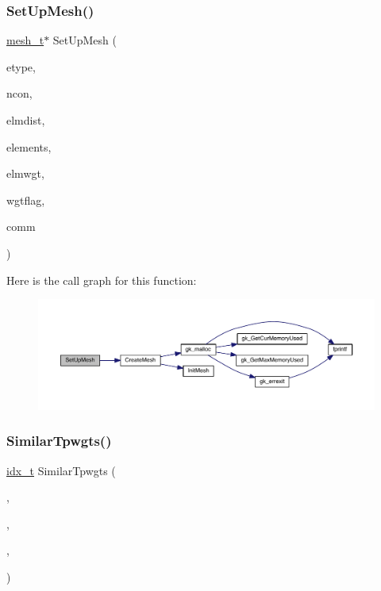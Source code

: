 \subsubsection{\texorpdfstring{Set\+Up\+Mesh()}{SetUpMesh()}}
{\footnotesize\ttfamily \hyperlink{a00738}{mesh\+\_\+t}$\ast$ Set\+Up\+Mesh (\begin{DoxyParamCaption}\item[{\hyperlink{a00876_aaa5262be3e700770163401acb0150f52}{idx\+\_\+t} $\ast$}]{etype,  }\item[{\hyperlink{a00876_aaa5262be3e700770163401acb0150f52}{idx\+\_\+t} $\ast$}]{ncon,  }\item[{\hyperlink{a00876_aaa5262be3e700770163401acb0150f52}{idx\+\_\+t} $\ast$}]{elmdist,  }\item[{\hyperlink{a00876_aaa5262be3e700770163401acb0150f52}{idx\+\_\+t} $\ast$}]{elements,  }\item[{\hyperlink{a00876_aaa5262be3e700770163401acb0150f52}{idx\+\_\+t} $\ast$}]{elmwgt,  }\item[{\hyperlink{a00876_aaa5262be3e700770163401acb0150f52}{idx\+\_\+t} $\ast$}]{wgtflag,  }\item[{M\+P\+I\+\_\+\+Comm $\ast$}]{comm }\end{DoxyParamCaption})}

Here is the call graph for this function\+:\nopagebreak
\begin{figure}[H]
\begin{center}
\leavevmode
\includegraphics[width=350pt]{a00951_a9f9b575b1270719a1d7ae34f89ed2dc5_cgraph}
\end{center}
\end{figure}
\mbox{\label{a00951_abfd66496e3aed0dff8e1c982c3ab11b3}} 
\subsubsection{\texorpdfstring{Similar\+Tpwgts()}{SimilarTpwgts()}}
{\footnotesize\ttfamily \hyperlink{a00876_aaa5262be3e700770163401acb0150f52}{idx\+\_\+t} Similar\+Tpwgts (\begin{DoxyParamCaption}\item[{\hyperlink{a00876_a1924a4f6907cc3833213aba1f07fcbe9}{real\+\_\+t} $\ast$}]{,  }\item[{\hyperlink{a00876_aaa5262be3e700770163401acb0150f52}{idx\+\_\+t}}]{,  }\item[{\hyperlink{a00876_aaa5262be3e700770163401acb0150f52}{idx\+\_\+t}}]{,  }\item[{\hyperlink{a00876_aaa5262be3e700770163401acb0150f52}{idx\+\_\+t}}]{ }\end{DoxyParamCaption})}

